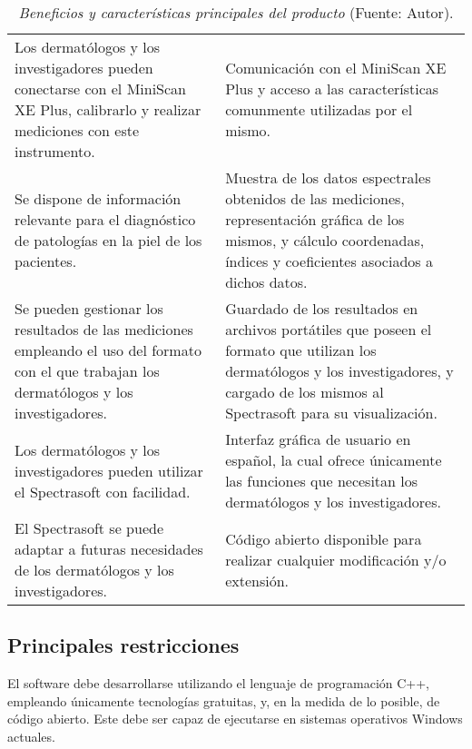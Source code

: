	\begin{table}[h]
		\small
		\caption[Beneficios y caracter\'{i}sticas principales del producto]{\textit{Beneficios y caracter\'{i}sticas principales del producto} (Fuente: Autor).}
		\centering
		\setlength{\extrarowheight}{\altocelda}
		\begin{tabulary}{\anchotabla}{|J|J|}
			\hline
			 & \\ \hline
			Los dermat\'{o}logos y los investigadores pueden conectarse con el MiniScan XE Plus, calibrarlo y realizar mediciones con este instrumento. & 
			Comunicaci\'{o}n con el MiniScan XE Plus y acceso a las caracter\'{i}sticas comunmente utilizadas por el mismo.\\ \hline
			Se dispone de informaci\'{o}n relevante para el diagn\'{o}stico de patolog\'{i}as en la piel de los pacientes. &
			Muestra de los datos espectrales obtenidos de las mediciones, representaci\'{o}n gr\'{a}fica de los mismos, y c\'{a}lculo coordenadas, \'{i}ndices y coeficientes asociados a dichos datos.\\ \hline
			Se pueden gestionar los resultados de las mediciones empleando el uso del formato con el que trabajan los dermat\'{o}logos y los investigadores. &
			Guardado de los resultados en archivos port\'{a}tiles que poseen el formato que utilizan los dermat\'{o}logos y los investigadores, y cargado de los mismos al Spectrasoft para su visualizaci\'{o}n.\\ \hline
			Los dermat\'{o}logos y los investigadores pueden utilizar el Spectrasoft con facilidad. &
			Interfaz gr\'{a}fica de usuario en espa\~{n}ol, la cual ofrece \'{u}nicamente las funciones que necesitan los dermat\'{o}logos y los investigadores.\\ \hline
			El Spectrasoft se puede adaptar a futuras necesidades de los dermat\'{o}logos y los investigadores. &
			C\'{o}digo abierto disponible para realizar cualquier modificaci\'{o}n y/o extensi\'{o}n.\\ \hline
		\end{tabulary}
	\end{table}
	
	\subsection{Principales restricciones}
	
	El software debe desarrollarse utilizando el lenguaje de programaci\'{o}n C++, empleando \'{u}nicamente tecnolog\'{i}as gratuitas, y, en la medida de lo posible, de c\'{o}digo abierto. Este debe ser capaz de ejecutarse en sistemas operativos Windows actuales.
	
